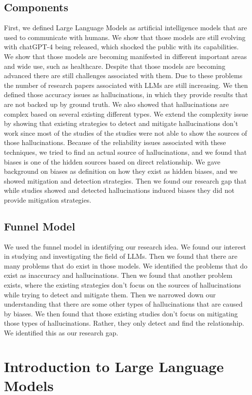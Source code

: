\documentclass[twocolumn]{article}
\begin{document}
\subsection{Components}
First, we defined Large Language Models as artificial intelligence models that are used to communicate with humans. We show that those models are still evolving with chatGPT-4 being released, which shocked the public with its capabilities. We show that those models are becoming manifested in different important areas and wide use, such as healthcare. Despite that those models are becoming advanced there are still challenges associated with them. Due to these problems the number of research papers associated with LLMs are still increasing. We then defined those accuracy issues as hallucinations, in which they provide results that are not backed up by ground truth. We also showed that hallucinations are complex based on several existing different types. We extend the complexity issue by showing that existing strategies to detect and mitigate hallucinations don't work since most of the studies of the studies were not able to show the sources of those hallucinations. Because of the reliability issues associated with these techniques, we tried to find an actual source of hallucinations, and we found that biases is one of the hidden sources based on direct relationship. We gave background on biases as definition on how they exist as hidden biases, and we showed mitigation and detection strategies. Then we found our research gap that while studies showed and detected hallucinations induced biases they did not provide mitigation strategies.
\subsection{Funnel Model}
We used the funnel model in identifying our research idea. We found our interest in studying and investigating the field of LLMs. Then we found that there are many problems that do exist in those models. We identified the problems that do exist as inaccuracy and hallucinations. Then we found that another problem exists, where the existing strategies don’t focus on the sources of hallucinations while trying to detect and mitigate them. Then we narrowed down our understanding that there are some other types of hallucinations that are caused by biases. We then found that those existing studies don’t focus on mitigating those types of hallucinations. Rather, they only detect and find the relationship. We identified this as our research gap. 
\section{Introduction to Large Language Models}
\end{document}
